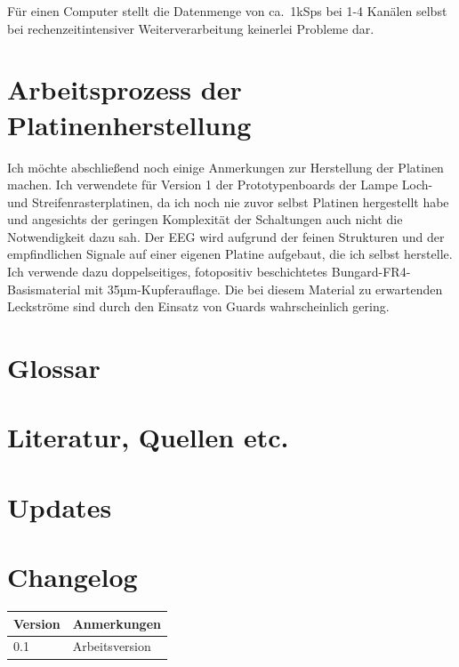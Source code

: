 \documentclass[12pt,a4paper,notitlepage]{article}
\begin{document}
Für einen Computer stellt die Datenmenge von ca.\ 1kSps bei 1-4 Kanälen selbst bei rechenzeitintensiver Weiterverarbeitung keinerlei Probleme dar.

\section{Arbeitsprozess der Platinenherstellung}
Ich möchte abschließend noch einige Anmerkungen zur Herstellung der Platinen machen. Ich verwendete für Version 1 der Prototypenboards der Lampe Loch- und Streifenrasterplatinen, da ich noch nie zuvor selbst Platinen hergestellt habe und angesichts der geringen Komplexität der Schaltungen auch nicht die Notwendigkeit dazu sah. Der EEG wird aufgrund der feinen Strukturen und der empfindlichen Signale auf einer eigenen Platine aufgebaut, die ich selbst herstelle. Ich verwende dazu doppelseitiges, fotopositiv beschichtetes Bungard-FR4-Basismaterial mit 35µm-Kupferauflage. Die bei diesem Material zu erwartenden Leckströme sind durch den Einsatz von Guards wahrscheinlich gering\cite{BUNGARD1,ANALOG1,ANALOG2,MAXIM56,MAXIM55,MAXIM52}.
\appendix
\section{Glossar}
\glsaddall
\printglossaries
\section{Literatur, Quellen etc.}
\nocite{STELTZ1}
\nocite{TEXAS2,TEXAS3,TEXAS4,TEXAS5,TEXAS6,TEXAS7,TEXAS8,TEXAS9}
\nocite{MAXIM46,MAXIM48}
\nocite{MAXIM75,MAXIM73,MAXIM72,MAXIM71,MAXIM69,MAXIM68,MAXIM67,MAXIM66,MAXIM65,MAXIM62,MAXIM57,MAXIM54,MAXIM53,MAXIM51,MAXIM47}
\nocite{MAXIM50}

\renewcommand{\refname}{}

\section{Updates}
\begin{center}
\end{center}
\section{Changelog}
\begin{tabularx}{\textwidth}{l|l}
\textbf{Version}&\textbf{Anmerkungen}\\\hline
0.1&Arbeitsversion
\end{tabularx}
\end{document}
